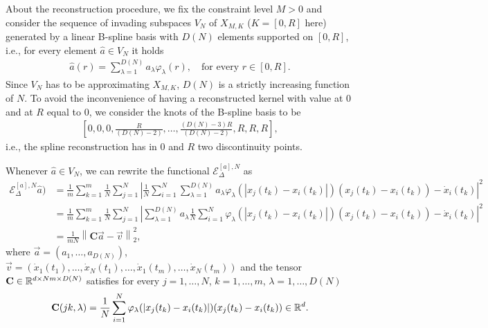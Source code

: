 About the reconstruction procedure, we fix the constraint level $M>0$ and consider the sequence of invading subspaces $V_N$ of $X_{M,K}$ ($K=[0, R]$ here) generated by a linear B-spline basis with $D(N) $ elements supported on $[0,R]$, i.e., for every element $\widehat{a} \in V_N$ it holds
\begin{align*}
	\widehat{a}(r) = \sum^{D(N)}_{\lambda = 1} a_{\lambda} \varphi_{\lambda}(r), \quad \text{for every } r \in [0,R].
\end{align*}
Since $V_N$ has to be approximating $X_{M,K}$, $D(N)$ is a strictly increasing function of $N$. To avoid the inconvenience of having a reconstructed kernel with value at $0$ and at $R$ equal to $0$, we consider the knots of the B-spline basis to be
\begin{align}\label{eq:knots}
\left[0,0,0,\frac{R}{(D(N)-2)},\ldots,\frac{(D(N) - 3)R}{(D(N)-2)},R,R,R\right],
\end{align}
i.e., the spline reconstruction has in $0$ and $R$ two discontinuity points.

Whenever $\widehat{a} \in V_N$, we can rewrite the functional $\mathcal{E}^{[a],N}_\Delta$ as
\begin{align*}
\mathcal{E}^{[a],N}_\Delta\widehat{a}) & = \frac{1}{m} \sum^m_{k = 1} \frac{1}{N} \sum^N_{j = 1} \left| \frac{1}{N} \sum^N_{i = 1} \sum^{D(N)}_{\lambda = 1} a_{\lambda} \varphi_{\lambda}(|x_j(t_k) - x_i(t_k)|)(x_j(t_k) - x_i(t_k)) - \dot{x}_i(t_k)\right|^2 \\
& = \frac{1}{m} \sum^m_{k = 1} \frac{1}{N} \sum^N_{j = 1} \left| \sum^{D(N)}_{\lambda = 1} a_{\lambda} \frac{1}{N} \sum^N_{i = 1} \varphi_{\lambda}(|x_j(t_k) - x_i(t_k)|)(x_j(t_k) - x_i(t_k)) - \dot{x}_i(t_k)\right|^2 \\
& = \frac{1}{mN} \left\| \mathbf C  \vec{a} - \vec v \right\|^2_{2},
\end{align*}
where $\vec{a} = (a_1, \ldots, a_{D(N)})$, $\vec v = (\dot{x}_1(t_1), \ldots, \dot{x}_N(t_1), \ldots,\dot{x}_1(t_m), \ldots, \dot{x}_N(t_m))$ and the tensor $\mathbf C \in \mathbb{R}^{d\times Nm \times D(N)}$ satisfies for every $j = 1, \ldots,N$, $k = 1, \ldots,m$, $\lambda = 1, \ldots,D(N)$
\begin{align*}
\mathbf C(jk,\lambda) = \frac{1}{N} \sum^N_{i = 1} \varphi_{\lambda}(|x_j(t_k) - x_i(t_k)|)(x_j(t_k) - x_i(t_k)) \in \mathbb{R}^d.
\end{align*}

